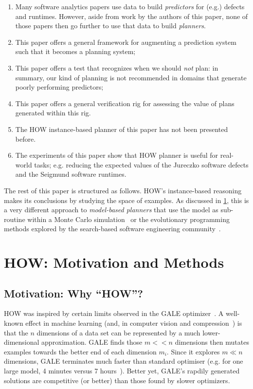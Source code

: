 \documentclass[conference]{IEEEtran}
\newcommand{\be}{\begin{enumerate}}
\newcommand{\ee}{\end{enumerate}}
\newcommand{\tion}[1]{\textsection\ref{sec:#1}}
\begin{document}
\be
\item Many software analytics papers use data to build {\em predictors} for (e.g.) defects and runtimes.
However, aside from work by the authors of this paper,
none of those papers then go further to use that data to build {\em planners}.
\item This paper offers a general framework for augmenting a prediction system such that
it becomes a planning system;
\item This paper offers a  test that recognizes  when we should {\em not}  plan: in summary, our kind of planning is
not recommended in domains that  generate poorly performing predictors;
\item This paper offers a general verification rig for assessing the value of plans generated within this rig.
\item The HOW  instance-based planner of this paper has not been presented before.
\item The experiments of this paper show that HOW planner is useful for real-world tasks;
e.g. reducing the
expected values of the Jureczko software defects and the Seigmund software runtimes.
\ee
The rest of this paper is structured as follows.
HOW's instance-based reasoning  makes its conclusions by
studying the space of examples. As discussed in \tion{mm},
this is a very different approach to
{\em model-based planners} that use the model
as sub-routine within a Monte Carlo simulation~\cite{me07f} or the evolutionary 
programming methods explored by the search-based software
engineering community~\cite{krall14,harman12dec}.  
 
 

\section{HOW: Motivation and Methods}\label{sec:mm}
 
 \subsection{Motivation: Why ``HOW''?}
HOW was inspired by certain  limits observed in 
the GALE optimizer~\cite{krall14}. 
A well-known effect in machine learning (and, in computer vision
and compression~\cite{levina04}) is that the $n$ dimensions of a data set can be represented by a  much
lower-dimensional approximation. GALE finds those $m << n$ dimensions then mutates examples
towards the better end of each dimension $m_i$. Since it explores $m \ll n$ dimensions,
GALE terminates much faster than standard optimiser (e.g. for one large model, 4 minutes versus 7 hours~\cite{krall14}).
Better yet, GALE's rapdily generated  solutions are competitive (or better) than those found by 
slower optimizers.
\end{document}
